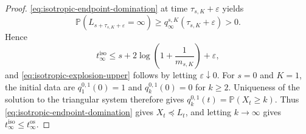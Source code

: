 \documentclass[10pt,a4paper]{amsart}
\begin{document}
\begin{proof}
\eqref{eq:isotropic-endpoint-domination} at time
$\tau_{s,K}+\varepsilon$ yields
\[
\mathbb P
(L_{s+\tau_{s,K}+\varepsilon}=\infty)
\geq
q_\infty^{s,K}(\tau_{s,K}+\varepsilon)>0.
\]
Hence
\[
t_{\infty}^{\mathrm{iso}}
\leq
s+2\log\left(1+\frac1{m_{s,K}}\right)+\varepsilon,
\]
and \eqref{eq:isotropic-explosion-upper} follows by letting
$\varepsilon\downarrow0$.
For $s=0$ and $K=1$, the initial data are
$q_1^{0,1}(0)=1$ and $q_k^{0,1}(0)=0$ for $k\geq2$. Uniqueness of the solution to the
triangular system therefore gives
$q_k^{0,1}(t)=\mathbb P(X_t\geq k)$. Thus
\eqref{eq:isotropic-endpoint-domination} gives $X_t\preceq L_t$, and
letting $k\to\infty$ gives
$t_{\infty}^{\mathrm{iso}}\leq t_{\infty}^{\mathrm{os}}$.
\end{proof}
\end{document}
